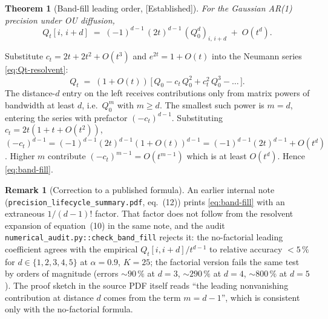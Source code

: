 \documentclass[11pt]{article}
\newtheorem{theorem}[proposition]{Theorem}
\theoremstyle{definition}
\newtheorem{remark}{Remark}
\newcommand{\Established}{\textcolor{black!50!green}{\textsf{[Established]}}}
\begin{document}
\begin{theorem}[Band-fill leading order, \Established]\label{thm:band-fill}
For the Gaussian AR(1) precision under OU diffusion,
\begin{equation}\label{eq:band-fill}
    Q_t[i,\, i + d]
        \;=\; (-1)^{d - 1}\, (2 t)^{d - 1}\, (Q_0^d)_{i,\, i + d}
              \;+\; O(t^d).
\end{equation}
\end{theorem}

\begin{derivation}
Substitute \(c_t = 2 t + 2 t^2 + O(t^3)\) and \(e^{2 t} = 1 + O(t)\)
into the Neumann series \eqref{eq:Qt-resolvent}:
\begin{equation}
    Q_t \;=\; (1 + O(t))\,
              \bigl[\, Q_0 - c_t\, Q_0^2 + c_t^2\, Q_0^3 - \dots \,\bigr].
\end{equation}
The distance-\(d\) entry on the left receives contributions only from
matrix powers of bandwidth at least \(d\), i.e.\ \(Q_0^m\) with
\(m \geq d\). The smallest such power is \(m = d\), entering the
series with prefactor \((-c_t)^{d - 1}\). Substituting
\(c_t = 2 t (1 + t + O(t^2))\),
\((-c_t)^{d - 1} = (-1)^{d - 1} (2 t)^{d - 1} (1 + O(t))^{d - 1} =
(-1)^{d - 1} (2 t)^{d - 1} + O(t^d)\). Higher \(m\) contribute
\((-c_t)^{m - 1} = O(t^{m - 1})\) which is at least \(O(t^d)\). Hence
\eqref{eq:band-fill}.
\end{derivation}

\begin{remark}[Correction to a published formula]\label{rmk:correction}
An earlier internal note
(\texttt{precision\_lifecycle\_summary.pdf}, eq.~(12)) prints
\eqref{eq:band-fill} with an extraneous \(1 / (d - 1)!\) factor. That
factor does not follow from the resolvent expansion of equation~(10)
in the same note, and the audit
\texttt{numerical\_audit.py::check\_band\_fill} rejects it: the
no-factorial leading coefficient agrees with the empirical
\(Q_t[i, i + d] / t^{d - 1}\) to relative accuracy \(< 5\,\%\) for
\(d \in \{1, 2, 3, 4, 5\}\) at \(\alpha = 0.9\), \(K = 25\); the
factorial version fails the same test by orders of magnitude (errors
\(\sim 90\,\%\) at \(d = 3\), \(\sim 290\,\%\) at \(d = 4\),
\(\sim 800\,\%\) at \(d = 5\)). The proof sketch in the source PDF
itself reads ``the leading nonvanishing contribution at distance
\(d\) comes from the term \(m = d - 1\)'', which is consistent only
with the no-factorial formula.
\end{remark}
\end{document}
